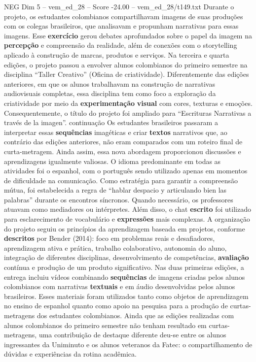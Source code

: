 \begin{textsample}{NEG Dim 5 – vem\_ed\_28 – Score -24.00 – vem\_ed\_28/t149.txt}
Durante o projeto, os estudantes colombianos compartilhavam imagens de suas produções com os colegas brasileiros, que analisavam e propunham narrativas para essas imagens.
Esse \textbf{exercício} gerou debates aprofundados sobre o papel da imagem na \textbf{percepção} e compreensão da realidade, além de conexões com o storytelling aplicado à construção de marcas, produtos e serviços.
Na terceira e quarta edições, o projeto passou a envolver alunos colombianos do primeiro semestre na disciplina “Taller Creativo” (Oficina de criatividade).
Diferentemente das edições anteriores, em que os alunos trabalhavam na construção de narrativas audiovisuais completas, essa disciplina tem como foco a exploração da criatividade por meio da \textbf{experimentação} \textbf{visual} com cores, texturas e emoções.
Consequentemente, o título do projeto foi ampliado para “Escrituras Narrativas a través de la imagen”. continuação Os estudantes brasileiros passaram a interpretar essas \textbf{sequências} imagéticas e criar \textbf{textos} narrativos que, ao contrário das edições anteriores, não eram comparados com um roteiro final de curta-metragem.
Ainda assim, essa nova abordagem proporcionou discussões e aprendizagens igualmente valiosas.
O idioma predominante em todas as atividades foi o espanhol, com o português sendo utilizado apenas em momentos de dificuldade na comunicação.
Como estratégia para garantir a compreensão mútua, foi estabelecida a regra de “hablar despacio y articulando bien las palabras” durante os encontros síncronos.
Quando necessário, os professores atuavam como mediadores ou intérpretes.
Além disso, o chat \textbf{escrito} foi utilizado para esclarecimento de vocabulário e \textbf{expressões} mais complexas.
A organização do projeto seguiu os princípios da aprendizagem baseada em projetos, conforme \textbf{descritos} por Bender (2014): foco em problemas reais e desafiadores, aprendizagem ativa e prática, trabalho colaborativo, autonomia do aluno, integração de diferentes disciplinas, desenvolvimento de competências, \textbf{avaliação} contínua e produção de um produto significativo.
Nas duas primeiras edições, a entrega incluiu vídeos combinando \textbf{sequências} de imagens criadas pelos alunos colombianos com narrativas \textbf{textuais} e em áudio desenvolvidas pelos alunos brasileiros.
Esses materiais foram utilizados tanto como objetos de aprendizagem no ensino de espanhol quanto como apoio na pesquisa para a produção de curtas-metragens dos estudantes colombianos.
Ainda que as edições realizadas com alunos colombianos do primeiro semestre não tenham resultado em curtas-metragens, uma contribuição de destaque diferente deu-se entre os alunos ingressantes da Uniminuto e os alunos veteranos da Fatec: o compartilhamento de dúvidas e experiências da rotina acadêmica.

\end{textsample}
